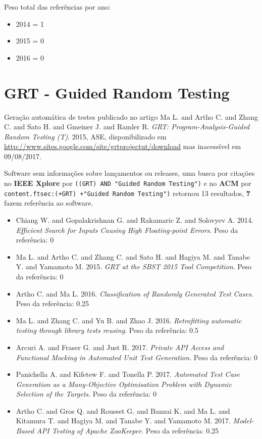 Peso total das referências por ano:

\begin{itemize}
\item 2014 = 1
\item 2015 = 0
\item 2016 = 0
\end{itemize}


\section{GRT - Guided Random Testing}

Geração automática de testes
publicado no artigo
Ma L. and Artho C. and Zhang C. and Sato H. and Gmeiner J. and Ramler R.
{\it GRT: Program-Analysis-Guided Random Testing (T)}.
2015,
ASE,
disponibilizado em \url{http://www.sites.google.com/site/grtprojectut/download}
mas inacessível em 09/08/2017.

Software sem informações sobre lançamentos ou releases,
uma busca por citações no {\bf IEEE Xplore} por
\texttt{((GRT) AND "Guided Random Testing")}
e no {\bf ACM} por
\texttt{content.ftsec:(+GRT) +"Guided Random Testing")}
retornou
13 resultados,
{\bf 7} fazem referência ao software.

\begin{itemize}
\item Chiang W. and Gopalakrishnan G. and Rakamaric Z. and Solovyev A.
      2014.
      {\it Efficient Search for Inputs Causing High Floating-point Errors}.
      Peso da referência: 0
\item Ma L. and Artho C. and Zhang C. and Sato H. and Hagiya M. and Tanabe Y. and Yamamoto M.
      2015.
      {\it GRT at the SBST 2015 Tool Competition}.
      Peso da referência: 0
\item Artho C. and Ma L.
      2016.
      {\it Classification of Randomly Generated Test Cases}.
      Peso da referência: 0.25
\item Ma L. and Zhang C. and Yu B. and Zhao J.
      2016.
      {\it Retrofitting automatic testing through library tests reusing}.
      Peso da referência: 0.5
\item Arcuri A. and Fraser G. and Just R.
      2017.
      {\it Private API Access and Functional Mocking in Automated Unit Test Generation}.
      Peso da referência: 0
\item Panichella A. and Kifetew F. and Tonella P.
      2017.
      {\it Automated Test Case Generation as a Many-Objective Optimisation Problem with Dynamic Selection of the Targets}.
      Peso da referência: 0
\item Artho C. and Gros Q. and Rousset G. and Banzai K. and Ma L. and Kitamura T. and Hagiya M. and Tanabe Y. and Yamamoto M.
      2017.
      {\it Model-Based API Testing of Apache ZooKeeper}.
      Peso da referência: 0.25
\end{itemize}

